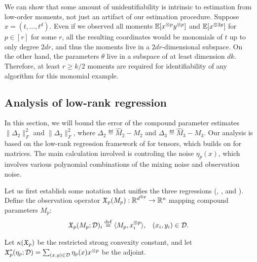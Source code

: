 We can show that some amount of unidentifiability is intrinsic to
estimation from low-order moments, not just an artifact of our
estimation procedure.  Suppose $x = (t, \dots, t^d)$.  Even if we
observed all moments $\operatorname{\mathbb{E}}[x^{\otimes p}y^{\otimes p}]$ and $\operatorname{\mathbb{E}}[x^{\otimes 2p}]$ for $p \in
[r]$ for some $r$, all the resulting coordinates would be monomials of $t$ up to only degree
$2dr$, and thus the moments live in a $2dr$-dimensional subspace.  On
the other hand, the parameters $\theta$ live in a subspace of at least
dimension $dk$.  Therefore, at least $r \ge k/2$ moments are required
for identifiability of any algorithm for this monomial example.

\subsection{Analysis of low-rank regression}
\label{sec:regression}

In this section, we will bound the error of
the compound parameter estimates $\|\Delta_2\|_F^2$ and $\|\Delta_3\|_F^2$,
where $\Delta_2 \eqdef \hat M_2 - M_2$
and $\Delta_3 \eqdef \hat M_3 - M_3$.
Our analysis is based on the low-rank regression framework of
\citet{Tomioka2011} for tensors, which builds on
\citet{NegahbanWainwright2009} for matrices.
The main calculation involved is controling the noise $\eta_p(x)$,
which involves various polynomial combinations of the mixing noise and observation noise.

Let us first establish some notation that unifies the three regressions (, , and ).
Define the observation operator $\operatorname{\mathfrak{X}}_p(M_p) : \mathbb{R}^{d^{\otimes p}} \to \mathbb{R}^{n}$
mapping compound parameters $M_p$:
\begin{align}
\operatorname{\mathfrak{X}}_p(M_p; \mathcal{D})_i &\stackrel{\rm def}{=} \langle M_p, x^{\otimes p}_i \rangle, & (x_i, y_i) \in \mathcal{D}.
\end{align}

Let $\kappa(\operatorname{\mathfrak{X}}_p)$ be the restricted strong convexity constant,
and let $\operatorname{\mathfrak{X}}^*_p(\eta_p; \mathcal{D}) = \sum_{(x,y) \in \mathcal{D}} \eta_p(x) x^{\otimes p}$
be the adjoint.




